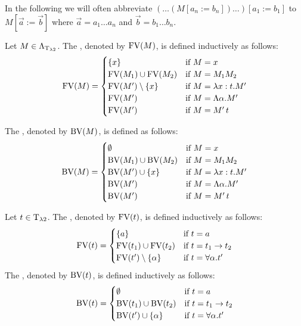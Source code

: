In the following we will often abbreviate $(\dots(M\left[a_n:=b_n\right])\dots)\left[a_1:=b_1\right]$ to $M\left[\vec{a}:=\vec{b}\right]$ where $\vec{a}=a_1\dots a_n$ and $\vec{b}=b_1\dots b_n$.

\begin{definition}\label{def.2.3}
	Let $M\in\Lambda_{\text{T}_{\lambda2}}$. The , denoted by $\text{FV}(M)$, is defined inductively as follows:
	\[\text{FV}(M)=
		\begin{cases}
			\{x\}                 & \text{if $M=x$}                \\
			\text{FV}(M_1)\cup\text{FV}(M_2)  & \text{if $M=M_1M_2$}           \\
			\text{FV}(M')\setminus\{x\} & \text{if $M=\lambda x:t.M'$}   \\
			\text{FV}(M')               & \text{if $M=\Lambda\alpha.M'$} \\
			\text{FV}(M')               & \text{if $M=M'\,t$}            \\
		\end{cases}\]
			
	The , denoted by $\text{BV}(M)$, is defined as follows:
	\[\text{BV}(M)=
		\begin{cases}
			\emptyset             & \text{if $M=x$}                \\ 
			\text{BV}(M_1)\cup\text{BV}(M_2)  & \text{if $M=M_1M_2$}           \\
			\text{BV}(M')\cup\{x\}      & \text{if $M=\lambda x:t.M'$}   \\
			\text{BV}(M')               & \text{if $M=\Lambda\alpha.M'$} \\
			\text{BV}(M')               & \text{if $M=M'\,t$}            \\
		\end{cases}\]
\end{definition}

\begin{definition}\label{def.2.4}
	Let $t\in\text{T}_{\lambda2}$. The , denoted by $\text{FV}(t)$, is defined inductively as follows:
	\[\text{FV}(t)=
		\begin{cases}
			\{a\}                 & \text{if $t=a$}                    \\ 
			\text{FV}(t_1)\cup\text{FV}(t_2)  & \text{if $t=t_1\to t_2$}           \\
			\text{FV}(t')\setminus\{\alpha\} & \text{if $t=\forall\alpha.t'$}\\
		\end{cases}\]
	The , denoted by $\text{BV}(t)$, is defined inductively as follows:
	\[\text{BV}(t)=
		\begin{cases}
			\emptyset              & \text{if $t=a$}                    \\ 
			\text{BV}(t_1)\cup\text{BV}(t_2)  & \text{if $t=t_1\to t_2$}           \\
			\text{BV}(t')\cup\{\alpha\} & \text{if $t=\forall\alpha.t'$}
		\end{cases}\]	
\end{definition}

